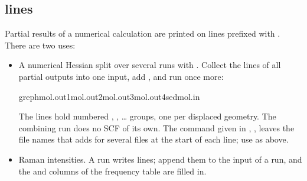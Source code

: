 \documentclass[letterpaper,10pt,english,openany,oneside]{sphinxmanual}
\begin{document}
\subsection{ lines}
\label{\detokenize{start/input-syntax:num-lines}}
\sphinxAtStartPar
Partial results of a numerical calculation are printed on lines prefixed with . There are two uses:
\begin{itemize}
\item {} 
\sphinxAtStartPar
A numerical Hessian split over several runs with {\hyperref[\detokenize{reference/d2edr2:d2edr2-steps}]{}}. Collect the  lines of
all partial outputs into one input, add , and run once more:

\begin{sphinxVerbatim}[commandchars=\\\{\}]
grep\PYGZhy{}hmol.out1mol.out2mol.out3mol.out4sed\PYGZgt{}\PYGZgt{}mol.in
\end{sphinxVerbatim}

\sphinxAtStartPar
The lines hold numbered , , … groups, one per displaced geometry. The combining run does
no SCF of its own. The command given in , , leaves the file names that  adds
for several files at the start of each line; use  as above.

\item {} 
\sphinxAtStartPar
Raman intensities. A  run writes  lines; append them to the input of a  run, and
the  and  columns of the frequency table are filled in.

\end{itemize}
\end{document}
